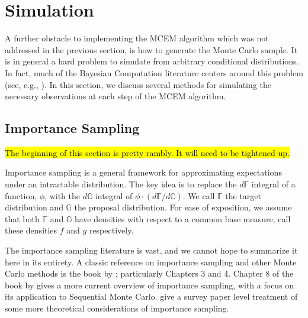 \documentclass[11pt, oneside]{article}   	%
\newcommand{\bF}{\mathbb{F}}
\newcommand{\bG}{\mathbb{G}}
\begin{document}
\begin{comment}
\footnotetext{For myself: As far as I can tell, in their paper, \citeauthor{Boo99} don't suggest that you check whether augmenting the Monte Carlo size produces a confidence set which does not contain the previous iteration's estimate. I think they're just suggesting you increase M and proceed with the next iteration. This differs from \citet{Caf05} who require that we keep checking and augmenting M until the condition is satisfied. \hl{I don't think this needs to go in the paper, but it's of some interest if you want to implement the method of} \citeauthor{Boo99}}
\end{comment}

\section{Simulation}

A further obstacle to implementing the MCEM algorithm which was not addressed in the previous section, is how to generate the Monte Carlo sample. It is in general a hard problem to simulate from arbitrary conditional distributions. In fact, much of the Bayesian Computation literature centers around this problem (see, e.g., \citealp{Gel13}). In this section, we discuss several methods for simulating the necessary observations at each step of the MCEM algorithm.

\subsection{Importance Sampling}

\hl{The beginning of this section is pretty rambly. It will need to be tightened-up.}

Importance sampling is a general framework for approximating expectations under an intractable distribution. The key idea is to replace the $d \bF$ integral of a function, $\phi$, with the $d \bG$ integral of $\phi \cdot (d \bF / d\bG)$. We call $\bF$ the target distribution and $\bG$ the proposal distribution. For ease of exposition, we assume that both $\bF$ and $\bG$ have densities with respect to a common base measure; call these densities $f$ and $g$ respectively.

The importance sampling literature is vast, and we cannot hope to summarize it here in its entirety. A classic reference on importance sampling and other Monte Carlo methods is the book by \citet{Rob04}; particularly Chapters 3 and 4. Chapter 8 of the book by \citet{Cho20} gives a more current overview of importance sampling, with a focus on its application to Sequential Monte Carlo. \citet{Aga17} give a survey paper level treatment of some more theoretical considerations of importance sampling.
\end{document}
